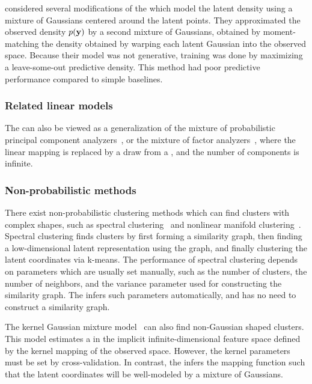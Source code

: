 \citet{nickisch2010gaussian} considered several modifications of the \gplvm{} which model the latent density using a mixture of Gaussians centered around the latent points.
They approximated the observed density $p({\bf{y}})$ by a second mixture of Gaussians, obtained by moment-matching the density obtained by warping each latent Gaussian into the observed space.
Because their model was not generative, training was done by maximizing a leave-some-out predictive density.
This method had poor predictive performance compared to simple baselines.


\subsubsection{Related linear models}
The \iwmm{} can also be viewed as a generalization of the mixture of probabilistic principal component analyzers~\citep{tipping1999mixtures}, or the mixture of factor analyzers~\citep{ghahramani2000variational}, where the linear mapping is replaced by a draw from a \gp{}, and the number of components is infinite.


\subsubsection{Non-probabilistic methods}
There exist non-probabilistic clustering methods which can find clusters with complex shapes, such as spectral clustering~\citep{ng2002spectral} and nonlinear manifold clustering~\citep{cao2006nonlinear,elhamifar2011sparse}.
Spectral clustering finds clusters by first forming a similarity graph, then finding a low-dimensional latent representation using the graph, and finally clustering the latent coordinates via k-means.
The performance of spectral clustering depends on parameters which are usually set manually, such as the number of clusters, the number of neighbors, and the variance parameter used for constructing the similarity graph.
The \iwmm{} infers such parameters automatically, and has no need to construct a similarity graph.

The kernel Gaussian mixture model~\citep{wang2003kernel} can also find non-Gaussian shaped clusters.
This model estimates a \GMM{} in the implicit infinite-dimensional feature space defined by the kernel mapping of the observed space.
However, the kernel parameters must be set by cross-validation.
In contrast, the \iwmm{} infers the mapping function such that the latent coordinates will be well-modeled by a mixture of Gaussians.


